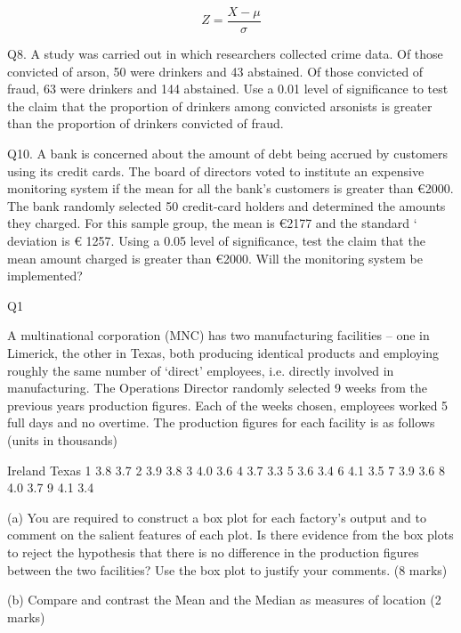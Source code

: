 \documentclass[]{report}
\begin{document}
\begin{enumerate}[(i)]
\begin{itemize}
\begin{equation}
Z = \frac{ X - \mu } {  \sigma }
\end{equation}



Q8. A study was carried out in which researchers collected crime data. Of those convicted of
arson, 50 were drinkers and 43 abstained. Of those convicted of fraud, 63 were drinkers and 144
abstained. Use a 0.01 level of significance to test the claim that the proportion of drinkers among
convicted arsonists is greater than the proportion of drinkers convicted of fraud.





Q10. A bank is concerned about the amount of debt being accrued by customers using its credit
cards. The board of directors voted to institute an expensive monitoring system if the mean for all
the bank’s customers is greater than €2000. The bank randomly selected 50 credit-card holders and
determined the amounts they charged. For this sample group, the mean is €2177 and the standard ‘
deviation is € 1257. Using a 0.05 level of significance,  test the claim that the mean amount charged
is greater than €2000. Will the monitoring system be implemented? 







Q1

A multinational corporation (MNC) has two manufacturing facilities – one in Limerick, the other in Texas, both producing identical products and employing roughly the same number of ‘direct’ employees, i.e. directly involved in manufacturing.  The Operations Director randomly selected 9 weeks from the previous years production figures.  Each of the weeks chosen, employees worked 5 full days and no overtime.  The production figures for each facility is as follows (units in thousands)


Ireland	Texas
1	3.8	3.7
2	3.9	3.8
3	4.0	3.6
4	3.7	3.3
5	3.6	3.4
6	4.1	3.5
7	3.9	3.6
8	4.0	3.7
9	4.1	3.4


(a)	You are required to construct a box plot for each factory’s output and to comment on the salient features of each plot.  Is there evidence from the box plots to reject the hypothesis that there is no difference in the production figures between the two facilities?  Use the box plot to justify your comments. 							(8 marks)

(b)	Compare and contrast the Mean and the Median as measures of location
(2 marks)


\end{itemize}
\end{enumerate}
\end{document}
